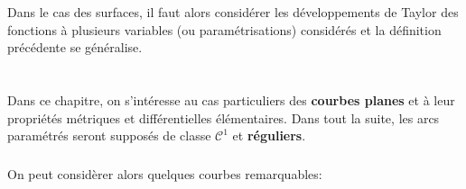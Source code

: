 Dans le cas des surfaces, il faut alors considérer les développements de Taylor des fonctions à plusieurs variables (ou paramétrisations) considérés et la définition précédente se généralise.

\chapter*{} %

Dans ce chapitre, on s'intéresse au cas particuliers des \textbf{courbes planes} et à leur propriétés métriques et différentielles élémentaires. Dans tout la suite, les arcs paramétrés seront supposés de classe \(\mathcal{C}^1\) et \textbf{réguliers}.

\subsection*{}
On peut considèrer alors quelques courbes remarquables:
